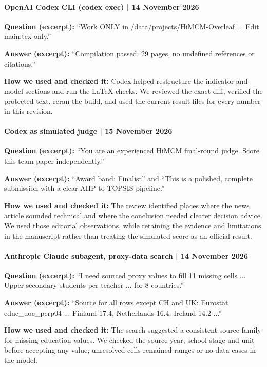 \documentclass{mcmthesis}
\begin{document}
\paragraph{OpenAI Codex CLI (codex exec) | 14 November 2026}
\textbf{Question (excerpt):} ``Work ONLY in /data/projects/HiMCM-Overleaf ... Edit main.tex only.''

\textbf{Answer (excerpt):} ``Compilation passed: 29 pages, no undefined references or citations.''

\textbf{How we used and checked it:} Codex helped restructure the indicator and model sections and run the LaTeX checks. We reviewed the exact diff, verified the protected text, reran the build, and used the current result files for every number in this revision.

\paragraph{Codex as simulated judge | 15 November 2026}
\textbf{Question (excerpt):} ``You are an experienced HiMCM final-round judge. Score this team paper independently.''

\textbf{Answer (excerpt):} ``Award band: Finalist'' and ``This is a polished, complete submission with a clear AHP to TOPSIS pipeline.''

\textbf{How we used and checked it:} The review identified places where the news article sounded technical and where the conclusion needed clearer decision advice. We used those editorial observations, while retaining the evidence and limitations in the manuscript rather than treating the simulated score as an official result.

\paragraph{Anthropic Claude subagent, proxy-data search | 14 November 2026}
\textbf{Question (excerpt):} ``I need sourced proxy values to fill 11 missing cells ... Upper-secondary students per teacher ... for 8 countries.''

\textbf{Answer (excerpt):} ``Source for all rows except CH and UK: Eurostat educ\_uoe\_perp04 ... Finland 17.4, Netherlands 16.4, Ireland 14.2 ...''

\textbf{How we used and checked it:} The search suggested a consistent source family for missing education values. We checked the source year, school stage and unit before accepting any value; unresolved cells remained ranges or no-data cases in the model.
\end{document}
